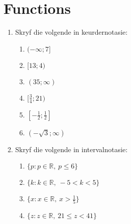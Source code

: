 \chapter{Functions}
\begin{exercises}{}
{
\begin{enumerate}[noitemsep, label=\textbf{\arabic*}. ] 
\item Skryf die volgende in keurdernotasie:
\begin{multicols}{2}
\begin{enumerate}[noitemsep, label=\textbf{(\alph*)} ] 
 \item $(-\infty; 7]$
\item $[13; 4)$
\item $(35; \infty)$
\item $[\frac{3}{4}; 21)$
\item $[-\frac{1}{2}; \frac{1}{2}]$
\item $(-\sqrt{3}; \infty)$
\end{enumerate}
\end{multicols}
\item Skryf die volgende in intervalnotasie:
\begin{multicols}{2}
\begin{enumerate}[noitemsep, label=\textbf{(\alph*)} ] 
 \item $\{p: p \in \mathbb{R},~ p \leq 6\}$
 \item $\{k: k \in \mathbb{R},~ -5 < k < 5\}$
 \item $\{x: x \in \mathbb{R},~ x > \frac{1}{5}\}$
 \item $\{z: z \in \mathbb{R},~ 21 \leq z < 41\}$
\end{enumerate}
\end{multicols}
\end{enumerate}

} 
\end{exercises}


